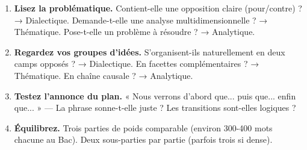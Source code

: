 \documentclass[11pt]{article}
\begin{document}
\begin{methode}
\begin{enumerate}
\item \textbf{Lisez la problématique.} Contient-elle une opposition claire (pour/contre) ? → Dialectique. Demande-t-elle une analyse multidimensionnelle ? → Thématique. Pose-t-elle un problème à résoudre ? → Analytique.
\item \textbf{Regardez vos groupes d'idées.} S'organisent-ils naturellement en deux camps opposés ? → Dialectique. En facettes complémentaires ? → Thématique. En chaîne causale ? → Analytique.
\item \textbf{Testez l'annonce du plan.} « Nous verrons d'abord que... puis que... enfin que... » — La phrase sonne-t-elle juste ? Les transitions sont-elles logiques ?
\item \textbf{Équilibrez.} Trois parties de poids comparable (environ 300-400 mots chacune au Bac). Deux sous-parties par partie (parfois trois si dense).
\end{enumerate}
\end{methode}
\end{document}
